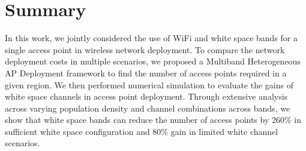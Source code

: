 \section{Summary}
\label{sec:moaconclusion}

In this work, we jointly considered the use of WiFi and white space bands for 
a single access point in wireless network deployment. To compare the network
deployment costs in multiple scenarios, we proposed a Multiband Heterogeneous AP
Deployment framework to find the number of access points required in a given region.
We then performed numerical simulation to evaluate the gains of white space channels
in access point deployment. Through extensive analysis across varying population 
density and channel combinations across bands, we show that white space bands 
can reduce the number of access points by 260\% in sufficient white space configuration
and 80\% gain in limited white channel scenarios.

%


